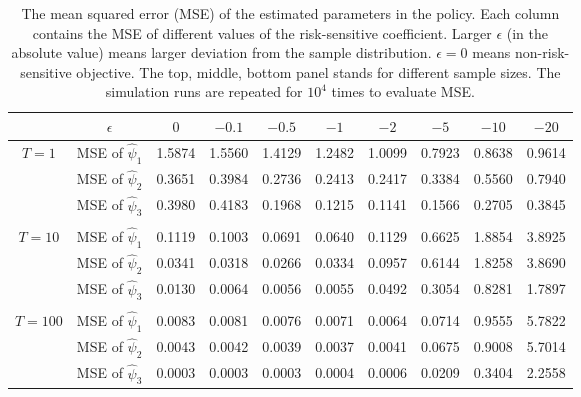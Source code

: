 \begin{table}[htbp]
	\centering
	\caption{The mean squared error (MSE) of the estimated parameters in the policy. Each column contains the MSE of different values of the risk-sensitive coefficient. Larger $\epsilon$ (in the absolute value) means larger deviation from the sample distribution. $\epsilon=0$ means non-risk-sensitive objective. The top, middle, bottom panel stands for different sample sizes. The simulation runs are repeated for $10^4$ times to evaluate MSE. }
	\begin{tabular}{cccccccccc}
		\toprule
		&  $\epsilon$     & $0$     & $-0.1$  & $-0.5$  & $-1$    & $-2$    & $-5$    & $-10$   & $-20$ \\
		\midrule
		$T=1$   & MSE of $\hat\psi_1$   & 1.5874 & 1.5560 & 1.4129 & 1.2482 & 1.0099 & 0.7923 & 0.8638 & 0.9614 \\
		& MSE of $\hat\psi_2$   & 0.3651 & 0.3984 & 0.2736 & 0.2413 & 0.2417 & 0.3384 & 0.5560 & 0.7940 \\
		& MSE of $\hat\psi_3$   & 0.3980 & 0.4183 & 0.1968 & 0.1215 & 0.1141 & 0.1566 & 0.2705 & 0.3845 \\
		&       &       &       &       &       &       &       &       &  \\
		$T=10$  & MSE of $\hat\psi_1$   & 0.1119 & 0.1003 & 0.0691 & 0.0640 & 0.1129 & 0.6625 & 1.8854 & 3.8925 \\
		& MSE of $\hat\psi_2$   & 0.0341 & 0.0318 & 0.0266 & 0.0334 & 0.0957 & 0.6144 & 1.8258 & 3.8690 \\
		& MSE of $\hat\psi_3$   & 0.0130 & 0.0064 & 0.0056 & 0.0055 & 0.0492 & 0.3054 & 0.8281 & 1.7897 \\
		&       &       &       &       &       &       &       &       &  \\
		$T=100$ & MSE of $\hat\psi_1$   & 0.0083 & 0.0081 & 0.0076 & 0.0071 & 0.0064 & 0.0714 & 0.9555 & 5.7822 \\
		& MSE of $\hat\psi_2$   & 0.0043 & 0.0042 & 0.0039 & 0.0037 & 0.0041 & 0.0675 & 0.9008 & 5.7014 \\
		& MSE of $\hat\psi_3$   & 0.0003 & 0.0003 & 0.0003 & 0.0004 & 0.0006 & 0.0209 & 0.3404 & 2.2558 \\
		\bottomrule
	\end{tabular}	\label{tab:lq offpolicy}\end{table}

